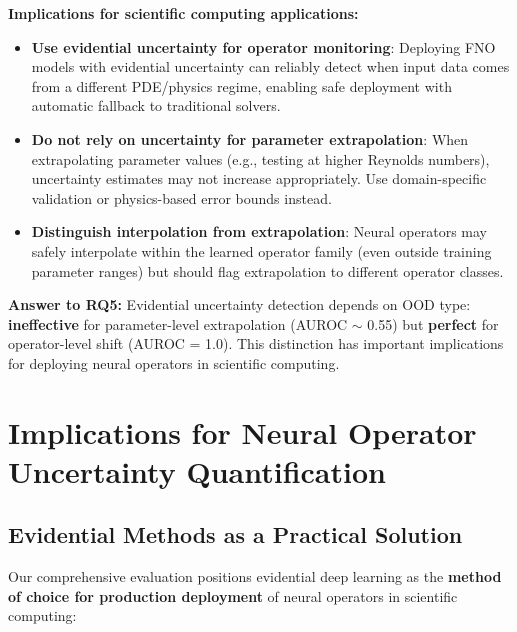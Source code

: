 \textbf{Implications for scientific computing applications:}
\begin{itemize}
\item \textbf{Use evidential uncertainty for operator monitoring}: Deploying FNO models with evidential uncertainty can reliably detect when input data comes from a different PDE/physics regime, enabling safe deployment with automatic fallback to traditional solvers.

\item \textbf{Do not rely on uncertainty for parameter extrapolation}: When extrapolating parameter values (e.g., testing at higher Reynolds numbers), uncertainty estimates may not increase appropriately. Use domain-specific validation or physics-based error bounds instead.

\item \textbf{Distinguish interpolation from extrapolation}: Neural operators may safely interpolate within the learned operator family (even outside training parameter ranges) but should flag extrapolation to different operator classes.
\end{itemize}

\textbf{Answer to RQ5:} Evidential uncertainty detection depends on OOD type: \textbf{ineffective} for parameter-level extrapolation (AUROC $\sim$ 0.55) but \textbf{perfect} for operator-level shift (AUROC = 1.0). This distinction has important implications for deploying neural operators in scientific computing.

\section{Implications for Neural Operator Uncertainty Quantification}

\subsection{Evidential Methods as a Practical Solution}

Our comprehensive evaluation positions evidential deep learning as the \textbf{method of choice for production deployment} of neural operators in scientific computing:

